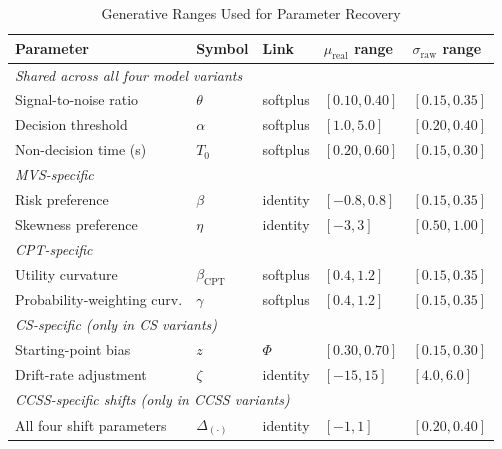 \documentclass[man,floatsintext]{apa7}
\begin{document}
\begin{table}[!htbp]
\centering
\begin{threeparttable}
\caption{Generative Ranges Used for Parameter Recovery}
\label{tab:recovery_priors}
\small
\setlength{\tabcolsep}{4pt}
\renewcommand{\arraystretch}{0.95}
\begin{tabularx}{\textwidth}{p{3.2cm}p{2.4cm}p{1.6cm}>{\centering\arraybackslash}X>{\centering\arraybackslash}X}
\toprule
\textbf{Parameter} & \textbf{Symbol} & \textbf{Link} & \textbf{$\mu_{\text{real}}$ range} & \textbf{$\sigma_{\text{raw}}$ range} \\
\midrule
\multicolumn{5}{l}{\textit{Shared across all four model variants}} \\
Signal-to-noise ratio         & $\theta$       & softplus & $[0.10, 0.40]$    & $[0.15, 0.35]$ \\
Decision threshold            & $\alpha$       & softplus & $[1.0, 5.0]$      & $[0.20, 0.40]$ \\
Non-decision time (s)         & $T_0$          & softplus & $[0.20, 0.60]$    & $[0.15, 0.30]$ \\[4pt]
\multicolumn{5}{l}{\textit{MVS-specific}} \\
Risk preference               & $\beta$        & identity & $[-0.8, 0.8]$     & $[0.15, 0.35]$ \\
Skewness preference           & $\eta$         & identity & $[-3, 3]$         & $[0.50, 1.00]$ \\[4pt]
\multicolumn{5}{l}{\textit{CPT-specific}} \\
Utility curvature             & $\beta_{\text{CPT}}$ & softplus & $[0.4, 1.2]$ & $[0.15, 0.35]$ \\
Probability-weighting curv.   & $\gamma$       & softplus & $[0.4, 1.2]$      & $[0.15, 0.35]$ \\[4pt]
\multicolumn{5}{l}{\textit{CS-specific (only in CS variants)}} \\
Starting-point bias           & $z$            & $\Phi$    & $[0.30, 0.70]$    & $[0.15, 0.30]$ \\
Drift-rate adjustment         & $\zeta$        & identity & $[-15, 15]$       & $[4.0, 6.0]$ \\[4pt]
\multicolumn{5}{l}{\textit{CCSS-specific shifts (only in CCSS variants)}} \\
All four shift parameters     & $\Delta_{(\cdot)}$ & identity & $[-1, 1]$    & $[0.20, 0.40]$ \\
\bottomrule
\end{tabularx}

\end{threeparttable}
\end{table}
\end{document}
